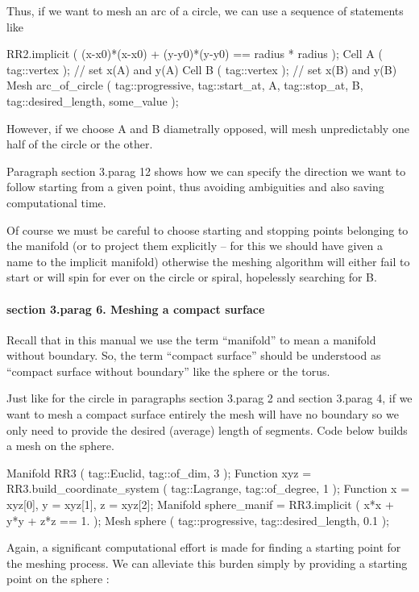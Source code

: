 Thus, if we want to mesh an arc of a circle, we can use a sequence of statements like

\verbatim
   RR2.implicit ( (x-x0)*(x-x0) + (y-y0)*(y-y0) == radius * radius );
   Cell A ( tag::vertex );  // set x(A) and y(A)
   Cell B ( tag::vertex );  // set x(B) and y(B)
   Mesh arc_of_circle ( tag::progressive, tag::start_at, A,
                        tag::stop_at, B, tag::desired_length, some_value );
\endverbatim

However, if we choose {\codett A} and {\codett B} diametrally opposed, {\maniFEM} will
mesh unpredictably one half of the circle or the other.

Paragraph \numb section 3.\numb parag 12 shows how we can specify the direction we
want to follow starting from a given point, thus avoiding ambiguities and also saving
computational time.

Of course we must be careful to choose starting and stopping points belonging to the manifold
(or to {\codett project} them explicitly -- for this we should have given a name to the
implicit manifold) otherwise the meshing algorithm will either fail to start or will spin
for ever on the circle or spiral, hopelessly searching for {\codett B}.


\paragraph{\numb section 3.\numb parag 6. Meshing a compact surface}

Recall that in this manual we use the term ``manifold'' to mean a manifold without boundary.
So, the term ``compact surface'' should be understood as ``compact surface without boundary''
like the sphere or the torus.

Just like for the {\codett circle} in paragraphs \numb section 3.\numb parag 2 and
\numb section 3.\numb parag 4,
if we want to mesh a compact surface entirely the mesh will have no boundary so we only need
to provide the desired (average) length of segments.
Code below builds a mesh on the sphere.

\verbatim
   Manifold RR3 ( tag::Euclid, tag::of_dim, 3 );
   Function xyz = RR3.build_coordinate_system ( tag::Lagrange, tag::of_degree, 1 );
   Function x = xyz[0],  y = xyz[1],  z = xyz[2];
   Manifold sphere_manif = RR3.implicit ( x*x + y*y + z*z == 1. );
   Mesh sphere ( tag::progressive, tag::desired_length, 0.1 );
\endverbatim

Again, a significant computational effort is made for finding a starting point
for the meshing process.
We can alleviate this burden simply by providing a starting point on the sphere :

